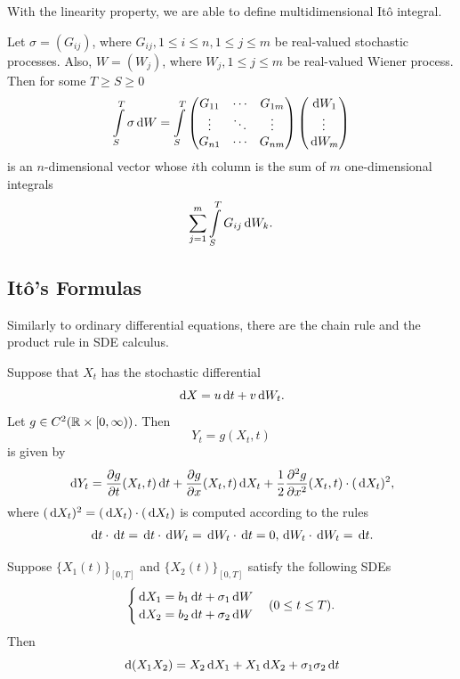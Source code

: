 With the linearity property, we are able to define multidimensional Itô integral.

\begin{definition}
  Let $\sigma=(G_{ij})$, where $G_{ij}, 1\le i\le n, 1\le j\le m$ be real-valued stochastic processes. Also, $W=(W_j)$, where $W_j,1\le j\le m$ be real-valued Wiener process. Then for some $T\ge S\ge 0$
  \begin{equation}
    \int\limits_S^T \sigma\,\mathrm{d} W=\int\limits_S^T\begin{pmatrix}
      G_{11} & \cdots & G_{1m} \\
      \vdots & \ddots & \vdots \\
      G_{n1} & \cdots & G_{nm}
    \end{pmatrix}\begin{pmatrix}
      \,\mathrm{d} W_1 \\\vdots\\\,\mathrm{d} W_m
    \end{pmatrix}
  \end{equation}
  is an $n$-dimensional vector whose $i$th column is the sum of $m$ one-dimensional integrals
  $$\sum\limits_{j=1}^m \int\limits_S^T G_{ij}\,\mathrm{d} W_k.$$
\end{definition}

\subsection{Itô's Formulas}
Similarly to ordinary differential equations, there are the chain rule and the product rule in SDE calculus.
\begin{theorem}
  Suppose that $X_t$ has the stochastic differential
  $$\,\mathrm{d} X = u\,\mathrm{d} t + v\,\mathrm{d} W_t.$$
  Let $g\in C^2(\mathbb{R}\times[0,\infty))$. Then
  $$Y_t=g(X_t,t)$$
  is given by
  \begin{equation}
    \label{equation:1dchainrule}
    \,\mathrm{d} Y_t=\dfrac{\partial g}{\partial t}(X_t,t)\,\mathrm{d} t+\dfrac{\partial g}{\partial x}(X_t,t)\,\mathrm{d} X_t+\dfrac{1}{2}\dfrac{\partial^2 g}{\partial x^2}(X_t,t)\cdot(\,\mathrm{d} X_t)^2,
  \end{equation}
  where $(\,\mathrm{d} X_t)^2=(\,\mathrm{d} X_t)\cdot(\,\mathrm{d} X_t)$ is computed according to the rules
  $$\,\mathrm{d} t\cdot\,\mathrm{d} t = \,\mathrm{d} t\cdot\,\mathrm{d} W_t = \,\mathrm{d} W_t\cdot\,\mathrm{d} t = 0, \,\mathrm{d} W_t\cdot\,\mathrm{d} W_t=\,\mathrm{d} t.$$
\end{theorem}

\begin{theorem}
  Suppose $\{X_1(t)\}_{[0,T]}$ and $\{X_2(t)\}_{[0,T]}$ satisfy the following SDEs
  $$\begin{cases}
      \,\mathrm{d} X_1 = b_1\,\mathrm{d} t+\sigma_1\,\mathrm{d} W \\
      \,\mathrm{d} X_2 = b_2\,\mathrm{d} t+\sigma_2\,\mathrm{d} W
    \end{cases}(0\le t\le T).$$
  Then
  \begin{equation}
    \label{theorem:ito-product}
    \,\mathrm{d} (X_1X_2)=X_2\,\mathrm{d} X_1+X_1\,\mathrm{d} X_2+\sigma_1\sigma_2\,\mathrm{d} t
  \end{equation}
\end{theorem}

